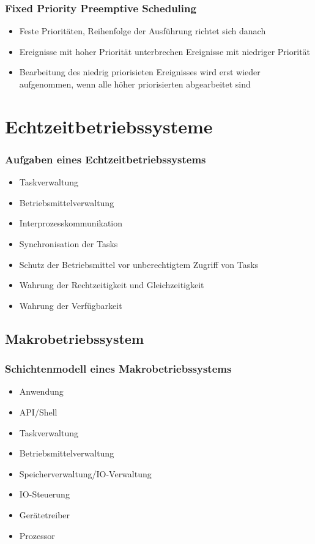 \subsubsection{Fixed Priority Preemptive Scheduling}
\begin{itemize}
	\item Feste Prioritäten, Reihenfolge der Ausführung richtet sich danach
	\item Ereignisse mit hoher Priorität unterbrechen Ereignisse mit niedriger Priorität
	\item Bearbeitung des niedrig priorisieten Ereignisses wird erst wieder aufgenommen, wenn alle höher priorisierten abgearbeitet sind
\end{itemize}



\section{Echtzeitbetriebssysteme}

\subsubsection{Aufgaben eines Echtzeitbetriebssystems}
\begin{itemize}
	\item Taskverwaltung
	\item Betriebsmittelverwaltung
	\item Interprozesskommunikation
	\item Synchronisation der Tasks
	\item Schutz der Betriebsmittel vor unberechtigtem Zugriff von Tasks
	\item Wahrung der Rechtzeitigkeit und Gleichzeitigkeit
	\item Wahrung der Verfügbarkeit
\end{itemize}


\subsection{Makrobetriebssystem}

\subsubsection{Schichtenmodell eines Makrobetriebssystems}
\begin{itemize}
	\item Anwendung
	\item API/Shell
	\item Taskverwaltung
	\item Betriebsmittelverwaltung
	\item Speicherverwaltung/IO-Verwaltung
	\item IO-Steuerung
	\item Gerätetreiber
	\item Prozessor
\end{itemize}


